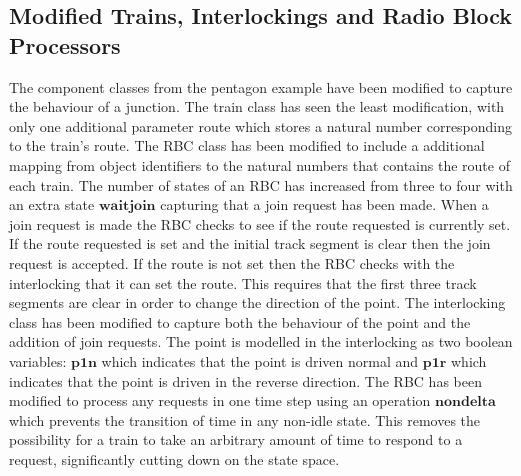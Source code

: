 \subsection*{Modified Trains, Interlockings and Radio Block Processors}
The component classes from the pentagon example have been modified to capture the behaviour of a junction.  The train class has seen the least modification, with only one additional parameter route which stores a natural number corresponding to the train's route. The RBC class has been modified to include a additional mapping from object identifiers to the natural numbers that contains the route of each train. The number of states of an RBC has increased from three to four with an extra state $\mathbf{waitjoin}$ capturing that a join request has been made. When a join request is made the RBC checks to see if the route requested is currently set. If the route requested is set and the initial track segment is clear then the join request is accepted. If the route is not set then the RBC checks with the interlocking that it can set the route. This requires that the first three track segments are clear in order to change the direction of the point. The interlocking class has been modified to capture both the behaviour of the point and the addition of join requests. The point is modelled in the interlocking as two boolean variables: $\mathbf{p1n}$ which indicates that the point is driven normal and $\mathbf{p1r}$ which indicates that the point is driven in the reverse direction.
%
The RBC has been modified to process any requests in one time step using an operation $\mathbf{nondelta}$ which prevents the transition of time in any non-idle state. This removes the possibility for a train to take an arbitrary amount of time to respond to a request, significantly cutting down on the state space.












